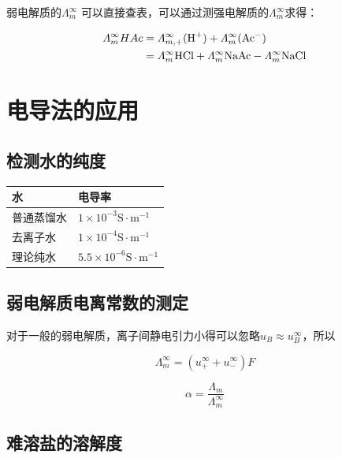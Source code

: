 \documentclass[a4paper]{ctexrep}
\begin{document}
        弱电解质的$\varLambda_m^\infty$ 可以直接查表，可以通过测强电解质的$\varLambda_m^\infty$求得：

        \begin{align*}
            \varLambda_m^\infty{HAc} &= \varLambda_{m, +}^\infty(\ce{H+}) + \varLambda_m^\infty(\ce{Ac-}) \\
            &= \varLambda_m^\infty{\ce{HCl}} + \varLambda_m^\infty{\ce{NaAc}} - \varLambda_m^\infty{\ce{NaCl}}
        \end{align*}
    
    \section{电导法的应用}


    \subsection{检测水的纯度}

    \begin{table}[h]
        \centering
        \begin{tabular}{ll}
            \toprule
            \textbf{水} & \textbf{电导率} \\
            \midrule
            普通蒸馏水 & $ 1 \times 10^{-3} \mathrm{S \cdot m^{-1}} $ \\
            去离子水 & $ 1 \times 10^{-4} \mathrm{S \cdot m^{-1}} $ \\
            理论纯水 & $ 5.5 \times 10^{-6} \mathrm{S \cdot m^{-1}} $ \\
            \bottomrule
        \end{tabular}
    \end{table}

    \subsection{弱电解质电离常数的测定}
    对于一般的弱电解质，离子间静电引力小得可以忽略$u_B \approx u_B^{\infty}$，所以

    \[
        \varLambda_m^{\infty} = (u_+^{\infty} + u_-^\infty)F 
    \]

    \[
        \alpha = \frac{\varLambda_m}{\varLambda_m^\infty}        
    \]


    \subsection{难溶盐的溶解度}
\end{document}
